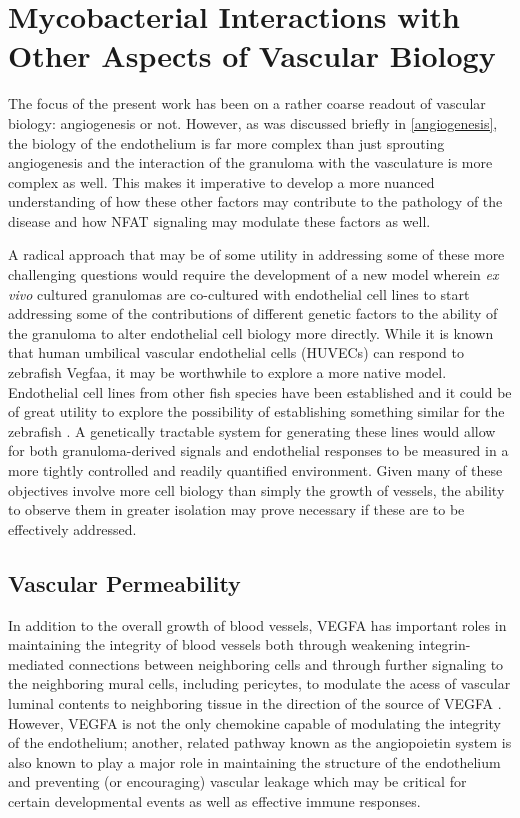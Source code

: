 \section{Mycobacterial Interactions with Other Aspects of Vascular Biology}\label{othervasc}

The focus of the present work has been on a rather coarse readout of vascular biology: angiogenesis or not. However, as was discussed briefly in \autoref{angiogenesis}, the biology of the endothelium is far more complex than just sprouting angiogenesis and the interaction of the granuloma with the vasculature is more complex as well. This makes it imperative to develop a more nuanced understanding of how these other factors may contribute to the pathology of the disease and how NFAT signaling may modulate these factors as well. 

A radical approach that may be of some utility in addressing some of these more challenging questions would require the development of a new model wherein \textit{ex vivo} cultured granulomas are co\hyp{}cultured with endothelial cell lines to start addressing some of the contributions of different genetic factors to the ability of the granuloma to alter endothelial cell biology more directly. While it is known that human umbilical vascular endothelial cells (HUVECs) can respond to zebrafish Vegfaa, it may be worthwhile to explore a more native model. Endothelial cell lines from other fish species have been established and it could be of great utility to explore the possibility of establishing something similar for the zebrafish \citep{Pham2017, Luque2014}. A genetically tractable system for generating these lines would allow for both granuloma\hyp{}derived signals and endothelial responses to be measured in a more tightly controlled and readily quantified environment. Given many of these objectives involve more cell biology than simply the growth of vessels, the ability to observe them in greater isolation may prove necessary if these are to be effectively addressed.

\subsection{Vascular Permeability}\label{permeability}

In addition to the overall growth of blood vessels, VEGFA has important roles in maintaining the integrity of blood vessels both through weakening integrin\hyp{}mediated connections between neighboring cells and through further signaling to the neighboring mural cells, including pericytes, to modulate the acess of vascular luminal contents to neighboring tissue in the direction of the source of VEGFA \citep{ParkWindhol2016, ClaessonWelsh2015}. However, VEGFA is not the only chemokine capable of modulating the integrity of the endothelium; another, related pathway known as the angiopoietin system is also known to play a major role in maintaining the structure of the endothelium and preventing (or encouraging) vascular leakage which may be critical for certain developmental events as well as effective immune responses.

